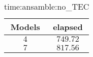 \begin{table}[!ht]
	\centering
	\begin{tabular}{|c|c|}
		\hline
		Models & elapsed \\ \hline
		$4$ & $749.72$ \\ \hline
		$7$ & $817.56$ \\ \hline
	\end{tabular}
	\caption{time:ansamble:no_TEC}
	\label{tab:time:ansamble:no_TEC}
\end{table}
